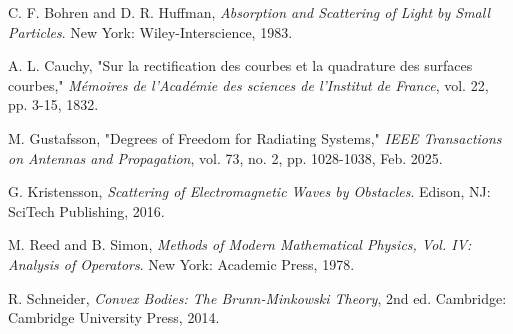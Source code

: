 \documentclass[12pt,a4paper]{article}
\theoremstyle{definition}
\begin{document}
\begin{thebibliography}{9}

C. F. Bohren and D. R. Huffman, \textit{Absorption and Scattering of Light by Small Particles}. New York: Wiley-Interscience, 1983.

A. L. Cauchy, "Sur la rectification des courbes et la quadrature des surfaces courbes," \textit{Mémoires de l'Académie des sciences de l'Institut de France}, vol. 22, pp. 3-15, 1832.

M. Gustafsson, "Degrees of Freedom for Radiating Systems," \textit{IEEE Transactions on Antennas and Propagation}, vol. 73, no. 2, pp. 1028-1038, Feb. 2025.

G. Kristensson, \textit{Scattering of Electromagnetic Waves by Obstacles}. Edison, NJ: SciTech Publishing, 2016.

M. Reed and B. Simon, \textit{Methods of Modern Mathematical Physics, Vol. IV: Analysis of Operators}. New York: Academic Press, 1978.

R. Schneider, \textit{Convex Bodies: The Brunn-Minkowski Theory}, 2nd ed. Cambridge: Cambridge University Press, 2014.

\end{thebibliography}
\end{document}
